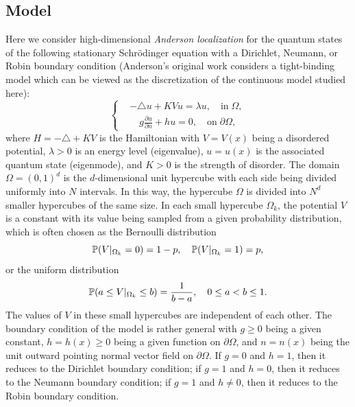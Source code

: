 \documentclass[a4paper,11pt]{article}
\begin{document}
\subsection{Model}
Here we consider high-dimensional \emph{Anderson localization} for the quantum states of the following stationary Schr\"{o}dinger equation with a Dirichlet, Neumann, or Robin boundary condition (Anderson's original work \cite{anderson1958absence} considers a tight-binding model which can be viewed as the discretization of the continuous model studied here):
\begin{equation}\label{anderson}
\left\{
\begin{split}
& -\triangle u + K V u = \lambda u, \quad \textrm{in} \; \Omega, \\
& \quad g \frac{\partial u}{\partial n} + h u = 0, \quad \textrm{on} \; \partial  \Omega,
\end{split}
\right.
\end{equation}
where $H = -\triangle + K V$ is the Hamiltonian with $V = V(x)$ being a disordered potential, $\lambda>0$ is an energy level (eigenvalue), $u = u(x)$ is the associated quantum state (eigenmode), and $K > 0$ is the strength of disorder. The domain $\Omega = (0,1)^d$ is the $d$-dimensional unit hypercube with each side being divided uniformly into $N$ intervals. In this way, the hypercube $\Omega$ is divided into $N^d$ smaller hypercubes of the same size. In each small hypercube $\Omega_k$, the potential $V$ is a constant with its value being sampled from a given probability distribution, which is often chosen as the Bernoulli distribution
\begin{equation}\label{bernoulli}
\mathbb{P}(V|_{\Omega_k} = 0) = 1-p, \quad \mathbb{P}(V|_{\Omega_k} = 1) = p,
\end{equation}
or the uniform distribution
\begin{equation*}
\mathbb{P}(a \leq V|_{\Omega_k} \leq b) = \frac{1}{b-a}, \quad 0 \leq a < b \leq 1.
\end{equation*}
The values of $V$ in these small hypercubes are independent of each other. The boundary condition of the model is rather general with $g \geq 0$ being a given constant, $h = h(x) \geq 0$ being a given function on $\partial \Omega$, and $n = n(x)$ being the unit outward pointing normal vector field on $\partial \Omega$. If $g = 0$ and $h = 1$, then it reduces to the Dirichlet boundary condition; if $g = 1$ and $h = 0$, then it reduces to the Neumann boundary condition; if $g = 1$ and $h \neq 0$, then it reduces to the Robin boundary condition.
\end{document}
